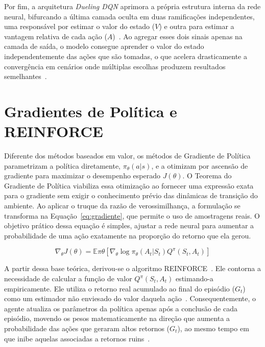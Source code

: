
Por fim, a arquitetura \textit{Dueling DQN} aprimora a própria estrutura interna da rede neural, bifurcando a última camada oculta em duas ramificações independentes, uma responsável por estimar o valor do estado ($V$) e outra para estimar a vantagem relativa de cada ação ($A$)~\cite{wang2016dueling}. Ao agregar esses dois sinais apenas na camada de saída, o modelo consegue aprender o valor do estado independentemente das ações que são tomadas, o que acelera drasticamente a convergência em cenários onde múltiplas escolhas produzem resultados semelhantes~\cite{wang2016dueling}.

\section*{Gradientes de Política e REINFORCE}

Diferente dos métodos baseados em valor, os métodos de Gradiente de Política parametrizam a política diretamente, $\pi_\theta(a|s)$, e a otimizam por ascensão de gradiente para maximizar o desempenho esperado $J(\theta)$. O Teorema do Gradiente de Política viabiliza essa otimização ao fornecer uma expressão exata para o gradiente sem exigir o conhecimento prévio das dinâmicas de transição do ambiente. Ao aplicar o truque da razão de verossimilhança, a formulação se transforma na Equação~\ref{eq:gradiente}, que permite o uso de amostragens reais. O objetivo prático dessa equação é simples, ajustar a rede neural para aumentar a probabilidade de uma ação exatamente na proporção do retorno que ela gerou.

\begin{equation} \nabla_\theta J(\theta) = \mathbb{E}{\pi\theta} \left[ \nabla_\theta \log \pi_\theta(A_t|S_t) Q^\pi(S_t, A_t) \right] \label{eq:gradiente} \end{equation}

A partir dessa base teórica, derivou-se o algoritmo REINFORCE~\cite{williams1992}. Ele contorna a necessidade de calcular a função de valor $Q^\pi(S_t, A_t)$ estimando-a empiricamente. Ele utiliza o retorno real acumulado ao final do episódio ($G_t$) como um estimador não enviesado do valor daquela ação~\cite{sutton2018}. Consequentemente, o agente atualiza os parâmetros da política apenas após a conclusão de cada episódio, movendo os pesos matematicamente na direção que aumenta a probabilidade das ações que geraram altos retornos ($G_t$), ao mesmo tempo em que inibe aquelas associadas a retornos ruins~\cite{sutton2018}.

